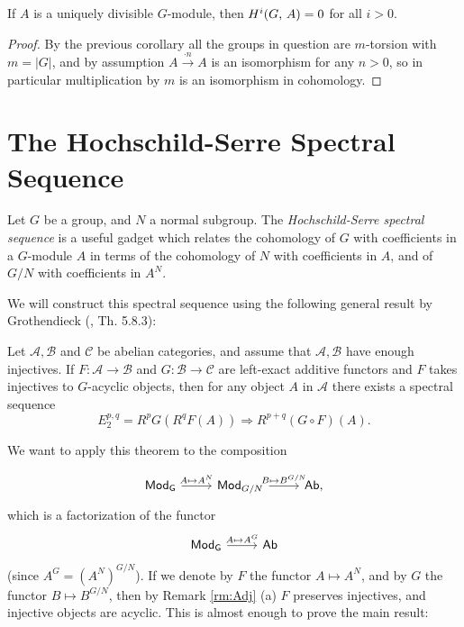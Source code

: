 \documentclass[a4paper, oneside]{memoir}
\begin{document}
\begin{corollary}\label{cor:UniqDiv}
	If $A$ is a uniquely divisible $G$-module, then $H^{i}( G, \, A )=0$ for all $i>0$.
\end{corollary}
\begin{proof}
	By the previous corollary all the groups in question are $m$-torsion with $m=|G|$, and by assumption $A\overset{\cdot n}{\to} A$ is an isomorphism for any $n>0$, so in particular multiplication by $m$ is an isomorphism in cohomology.
\end{proof}

\section{The Hochschild-Serre Spectral Sequence}

Let $G$ be a group, and $N$ a normal subgroup. The \textit{Hochschild-Serre spectral sequence} is a useful gadget which relates the cohomology of $G$ with coefficients in a $G$-module $A$ in terms of the cohomology of $N$ with coefficients in $A$, and of $G / N$ with coefficients in $A^N$.

We will construct this spectral sequence using the following general result by Grothendieck (\cite{Weibel}, Th. 5.8.3):
\begin{theorem}
	Let $\mathcal{A}, \mathcal{B}$ and $\mathcal{C}$ be abelian categories, and assume that $\mathcal{A}, \mathcal{B}$ have enough injectives. If $F: \mathcal{A}\to \mathcal{B}$ and $G: \mathcal{B}\to \mathcal{C}$ are left-exact additive functors and $F$ takes injectives to $G$-acyclic objects, then for any object $A$ in $\mathcal{A}$ there exists a spectral sequence
	\[
		E_2^{p,q} = R^pG(R^qF(A)) \Longrightarrow R^{p+q}(G\circ F)(A).
	\]
\end{theorem}

\noindent We want to apply this theorem to the composition

\[
	\begin{tikzcd}
		\Gmod \arrow[r, "A\mapsto A^N"] & \mathsf{Mod}_{G/N} \arrow[r, "B\mapsto B^{G/N}"] & \Ab,
	\end{tikzcd}
\]
which is a factorization of the functor
\[
	\begin{tikzcd}
		\Gmod \arrow[r, "A\mapsto A^G"] & \Ab
	\end{tikzcd}
\]
(since $A^G = (A^N)^{G/N}$). If we denote by $F$ the functor $A\mapsto A^N$, and by $G$ the functor $B\mapsto B^{G/N}$, then by Remark \ref{rm:Adj} (a) $F$ preserves injectives, and injective objects are acyclic. This is almost enough to prove the main result:
\end{document}
